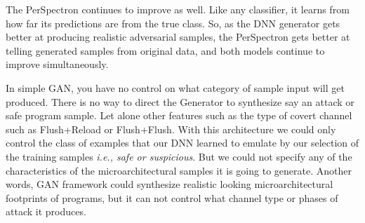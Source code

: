 The PerSpectron continues to improve as well. Like any classifier, it learns from how far its predictions are from the true class. 
So, as the DNN generator gets better at producing realistic adversarial samples, the PerSpectron gets better at telling generated samples from original data, and both models continue to improve simultaneously. 







 
 In simple GAN, you have no control on what category of sample input will get produced. There is no way to direct the Generator to synthesize say an attack or safe program sample. Let alone other features such as the type of covert channel such as Flush+Reload or Flush+Flush.
With this architecture we could only control the class of examples that our DNN learned to emulate by our selection of the training samples {\em i.e., safe or suspicious}. But we could not specify any of the characteristics of the microarchitectural samples it is going to generate. Another words, GAN framework could synthesize realistic looking microarchitectural footprints of programs, but it can not control what channel type or phases of attack it produces.

 
